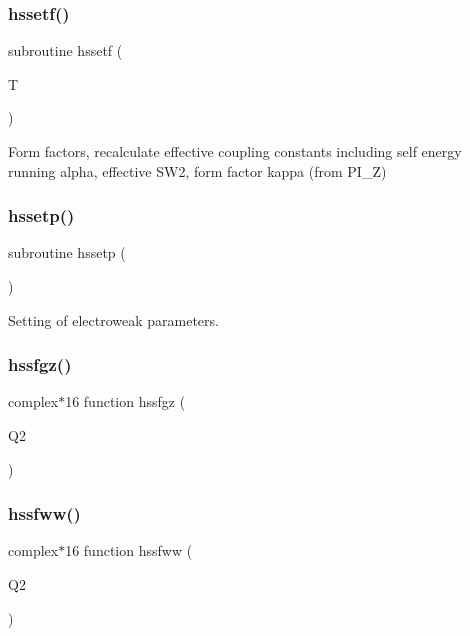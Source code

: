 \subsubsection{\texorpdfstring{hssetf()}{hssetf()}}
{\footnotesize\ttfamily subroutine hssetf (\begin{DoxyParamCaption}\item[{}]{T }\end{DoxyParamCaption})}



Form factors, recalculate effective coupling constants including self energy running alpha, effective S\+W2, form factor kappa (from P\+I\+\_\+Z) 

\mbox{\label{djangoh__h_8f_a478ee949c7cec470871f14198ba84b60}} 
\subsubsection{\texorpdfstring{hssetp()}{hssetp()}}
{\footnotesize\ttfamily subroutine hssetp (\begin{DoxyParamCaption}{ }\end{DoxyParamCaption})}



Setting of electroweak parameters. 

\mbox{\label{djangoh__h_8f_a079f3d821e8ec479336f1a89dc20a8e0}} 
\subsubsection{\texorpdfstring{hssfgz()}{hssfgz()}}
{\footnotesize\ttfamily complex$\ast$16 function hssfgz (\begin{DoxyParamCaption}\item[{}]{Q2 }\end{DoxyParamCaption})}

\mbox{\label{djangoh__h_8f_a7c6d4a59bfe41cfcb95989acaddf651c}} 
\subsubsection{\texorpdfstring{hssfww()}{hssfww()}}
{\footnotesize\ttfamily complex$\ast$16 function hssfww (\begin{DoxyParamCaption}\item[{}]{Q2 }\end{DoxyParamCaption})}

